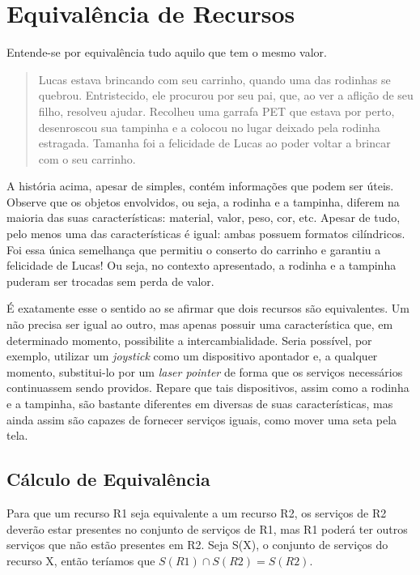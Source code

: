 \section{Equivalência de Recursos}
\label{sec:equivalenciaRecursos}

Entende-se por equivalência tudo aquilo que tem o mesmo valor.

\begin{quote}
	Lucas estava brincando com seu carrinho, quando uma das rodinhas se quebrou. Entristecido, ele procurou por seu pai, que, ao ver a aflição de seu filho, resolveu ajudar. Recolheu uma garrafa PET que estava por perto, desenroscou sua tampinha e a colocou no lugar deixado pela rodinha estragada. Tamanha foi a felicidade de Lucas ao poder voltar a brincar com o seu carrinho.
\end{quote}

A história acima, apesar de simples, contém informações que podem ser úteis. Observe que os objetos envolvidos, ou seja, a rodinha e a tampinha, diferem na maioria das suas características: material, valor, peso, cor, etc. Apesar de tudo, pelo menos uma das características é igual: ambas possuem formatos cilíndricos. Foi essa única semelhança que permitiu o conserto do carrinho e garantiu a felicidade de Lucas! Ou seja, no contexto apresentado, a rodinha e a tampinha puderam ser trocadas sem perda de valor.

É exatamente esse o sentido ao se afirmar que dois recursos são equivalentes. Um não precisa ser igual ao outro, mas apenas possuir uma característica que, em determinado momento, possibilite a intercambialidade. Seria possível, por exemplo, utilizar um \emph{joystick} como um dispositivo apontador e, a qualquer momento, substitui-lo por um \emph{laser pointer} de forma que os serviços necessários continuassem sendo providos. Repare que tais dispositivos, assim como a rodinha e a tampinha, são bastante diferentes em diversas de suas características, mas ainda assim são capazes de fornecer serviços iguais, como mover uma seta pela tela.

\subsection{Cálculo de Equivalência}

Para que um recurso R1 seja equivalente a um recurso R2, os serviços de R2 deverão estar presentes no conjunto de serviços de R1, mas R1 poderá ter outros serviços que não estão presentes em R2. Seja S(X), o conjunto de serviços do recurso X, então teríamos que $S(R1) \cap S(R2) = S(R2)$. 

